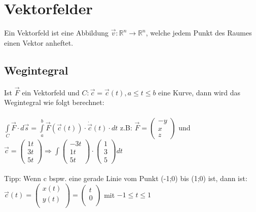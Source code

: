 \section{Vektorfelder}
  Ein Vektorfeld ist eine Abbildung $\vec{v}:\mathbb{R}^n\rightarrow
  \mathbb{R}^n$, welche jedem Punkt des Raumes einen Vektor anheftet.
  
\subsection{Wegintegral}
  Ist $\vec{F}$ ein Vektorfeld und $C:\vec{c}=\vec{c}(t),a\leq t \leq b$ eine
  Kurve, dann wird das Wegintegral wie folgt berechnet:\\\\
  $\boxed{\int\limits_C\vec{F}\cdot d\vec{s}=
  \int\limits_a^b\vec{F}(\vec{c}(t))\cdot \dot{\vec{c}}(t)\cdot dt}$
  z.B: $\vec{F}=\begin{pmatrix}
    -y \\
    x \\
    z
  \end{pmatrix}$ und $\vec c = \begin{pmatrix}
    1t \\
    3t \\
    5t 
  \end{pmatrix} \Rightarrow \int\begin{pmatrix}
    -3t\\
    1t \\
    5t
  \end{pmatrix} \cdot \begin{pmatrix}
    1\\
    3\\
    5
  \end{pmatrix} dt$
  \\\\
  Tipp: Wenn c bspw. eine gerade Linie vom Punkt (-1;0) bis (1;0) ist, dann ist:\\
  $\vec{c}(t)=
  \begin{pmatrix}
    x(t)\\
    y(t)\\
  \end{pmatrix}
  =
  \begin{pmatrix}
    t\\
    0\\
  \end{pmatrix}$
  mit $-1\leq t \leq 1$

